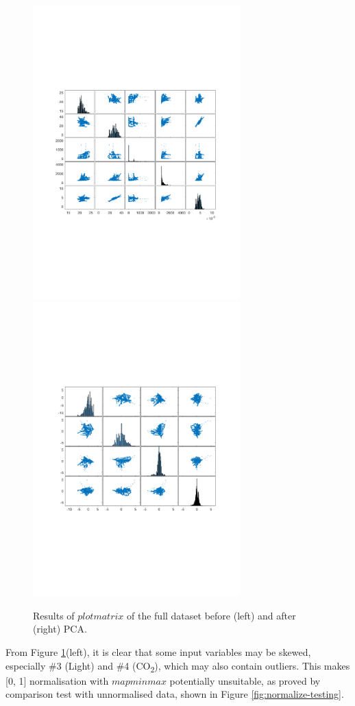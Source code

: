 \documentclass[10pt, oneside]{article}
\begin{document}
\begin{figure}[h]
\begin{center}
\includegraphics[width=8cm]{plotmatrix1.pdf}
\includegraphics[width=8cm]{plotmatrix2.pdf}
\end{center}
\caption{\label{fig:pca-before-after} Results of $plotmatrix$ of the full dataset before (left) and after (right) PCA.}
\end{figure}

From Figure \ref{fig:pca-before-after}(left), it is clear that some input variables may be skewed, especially \#3 (Light) and \#4 (CO\textsubscript{2}), which may also contain outliers. This makes [0, 1] normalisation with $mapminmax$ potentially unsuitable, as proved by comparison test with unnormalised data, shown in Figure \ref{fig:normalize-testing}.
\end{document}
